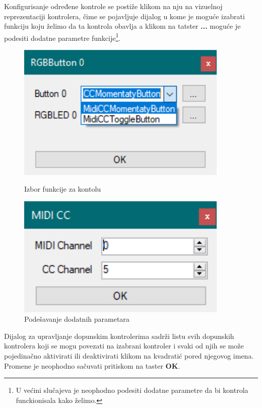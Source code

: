 \documentclass[12pt,oneside]{memoir}
\begin{document}
	Konfigurisanje određene kontrole se postiže klikom na nju na vizuelnoj reprezentaciji kontrolera, čime se pojavljuje dijalog u kome je moguće izabrati funkciju koju želimo da ta kontrola obavlja a klikom na tatster \textbf{...} moguće je podesiti dodatne parametre funkcije\footnote{U većini slučajeva je neophodno podesiti dodatne parametre da bi kontrola funckionisala kako želimo.}.\newline
	\begin{figure}[h]
		\centering
		\begin{minipage}{0.45\textwidth}
			\centering
			\includegraphics[width=0.9\textwidth]{cont} %
			\caption{Izbor funkcije za kontolu}
		\end{minipage}\hfill
		\begin{minipage}{0.45\textwidth}
			\centering
			\includegraphics[width=0.9\textwidth]{args} %
			\caption{Podešavanje dodatnih parametara}
		\end{minipage}
	\end{figure}
	Dijalog za upravljanje dopunskim kontrolerima sadrži listu svih dopunskih kontrolera koji se mogu povezati na izabrani kontroler i svaki od njih se može pojedinačno aktivirati ili deaktivirati klikom na kvadratić pored njegovog imena. Promene je neophodno sačuvati pritiskom na taster \textbf{OK}.\newline
\end{document}
